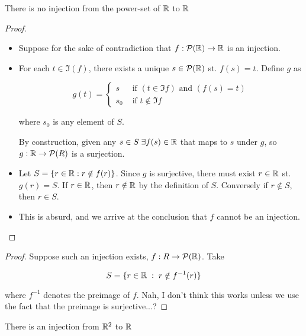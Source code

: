\documentclass[a4paper]{article}
\begin{document}
\begin{prop} 
	There is no injection from the power-set of $ \mathbb{R}  $ to $ \mathbb{R} $
\end{prop}
	\begin{proof}
	
	
		\begin{itemize}
			\item Suppose for the sake of contradiction that $ f: \mathcal{P} (\mathbb{R}) \to \mathbb{R} $ is an injection.
			\item For each $ t \in \Im(f) $, there exists a unique $ s \in \mathcal{P} ( \mathbb{R} ) $ st. $ f(s) = t $. Define $ g $ as 
			
			\[ g(t) = \begin{cases}  s & \text{ if } (t \in \Im f) \text{ and } (f(s) = t)\\ s_{0} & \text{ if } t \notin \Im f \end{cases} \]
			
			where $ s_{0} $ is any element of $ S $.
			
			By construction, given any $ s \in S \; \exists f(s) \in \mathbb{R} $ that maps to $ s $ under $ g $, so $ g : \mathbb{R} \to \mathcal{P}(R) $ is a surjection.
			
			\item Let $ S = \{  r \in \mathbb{R} : r \notin f(r) \}$. Since $ g $ is surjective, there must exist $ r \in \mathbb{R} $ st. $ g(r) = S $. If $ r \in \mathbb{R} $, then $ r \notin \mathbb{R} $ by the definition of $ S $. Conversely if $ r \notin S $, then $ r \in S $.
			
			\item This is absurd, and we arrive at the conclusion that $ f $ cannot be an injection.
		
	
		\end{itemize}
	\end{proof}


\begin{proof}
	Suppose such an injection exists, $ f: R \to \mathcal{P}(\mathbb{R})  $. Take 
	
	\[ S = \{ r \in \mathbb{R} \; : \; r \notin f^{-1} (r) \} \]
	
	where $ f^{-1} $ denotes the preimage of $ f $. Nah, I don't think this works unless we use the fact that the preimage is surjective...?
\end{proof}


\begin{prop} There is an injection from $ \mathbb{R}^{2} $ to $ \mathbb{R} $	
	
\end{prop}
\end{document}

